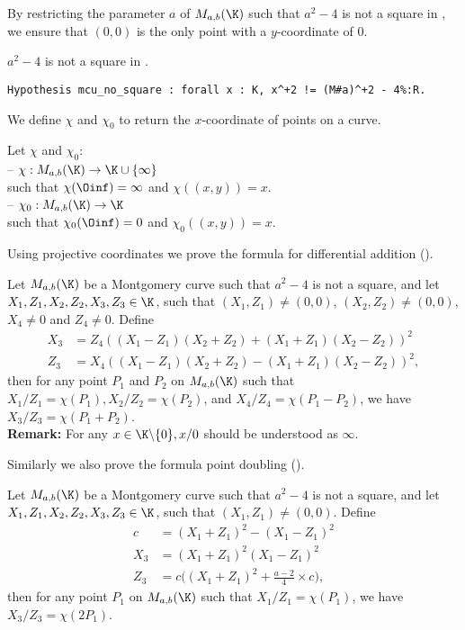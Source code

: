 By restricting the parameter $a$ of $M_{a,b}(\K)$ such that $a^2-4$ is not a
square in \K, we ensure that $(0,0)$ is the only point with a $y$-coordinate of $0$.
\begin{hypothesis}
\label{hyp:a_minus_4_not_square}
$a^2-4$ is not a square in \K.
\end{hypothesis}
\begin{lstlisting}[language=Coq]
Hypothesis mcu_no_square : forall x : K, x^+2 != (M#a)^+2 - 4%:R.
\end{lstlisting}

We define $\chi$ and $\chi_0$ to return the $x$-coordinate of points on a curve.
\begin{dfn}Let $\chi$ and $\chi_0$:\\
-- $\chi : M_{a,b}(\K) \to \K \cup \{\infty\}$\\
  such that $\chi(\Oinf) = \infty$ and $\chi((x,y)) = x$.\\
-- $\chi_0 : M_{a,b}(\K) \to \K$\\
  such that $\chi_0(\Oinf) = 0$ and $\chi_0((x,y)) = x$.
\end{dfn}
Using projective coordinates we prove the formula for differential addition ().
\begin{lemma}
\label{lemma:xADD}
Let $M_{a,b}(\K)$ be a Montgomery curve such that $a^2-4$ is not a square, and
let $X_1, Z_1, X_2, Z_2, X_3, Z_3 \in \K$, such that $(X_1,Z_1) \neq (0,0)$,
$(X_2,Z_2) \neq (0,0)$, $X_4 \neq 0$ and $Z_4 \neq 0$.
Define
\begin{align*}
X_3 &= Z_4((X_1 - Z_1)(X_2+Z_2) + (X_1+Z_1)(X_2-Z_2))^2\\
Z_3 &= X_4((X_1 - Z_1)(X_2+Z_2) - (X_1+Z_1)(X_2-Z_2))^2,
\end{align*}
then for any point $P_1$ and $P_2$ on $M_{a,b}(\K)$ such that
$X_1/Z_1 = \chi(P_1), X_2/Z_2 = \chi(P_2)$, and $X_4/Z_4 = \chi(P_1 - P_2)$,
we have $X_3/Z_3 = \chi(P_1+P_2)$.\\
\textbf{Remark:} For any $x \in \K \backslash\{0\}, x/0$ should be understood as $\infty$.
\end{lemma}
Similarly we also prove the formula point doubling ().
\begin{lemma}
\label{lemma:xDBL}
Let $M_{a,b}(\K)$ be a Montgomery curve such that $a^2-4$ is not a square, and
let $X_1, Z_1, X_2, Z_2, X_3, Z_3 \in \K$, such that $(X_1,Z_1) \neq (0,0)$. Define
\begin{align*}
  c &= (X_1 + Z_1)^2 - (X_1 - Z_1)^2\\
X_3 &= (X_1 + Z_1)^2(X_1-Z_1)^2\\
Z_3 &= c\Big((X_1 + Z_1)^2+\frac{a-2}{4}\times c\Big),
\end{align*}
then for any point $P_1$ on $M_{a,b}(\K)$ such that $X_1/Z_1 = \chi(P_1)$,
we have $X_3/Z_3 = \chi(2P_1)$.
\end{lemma}

